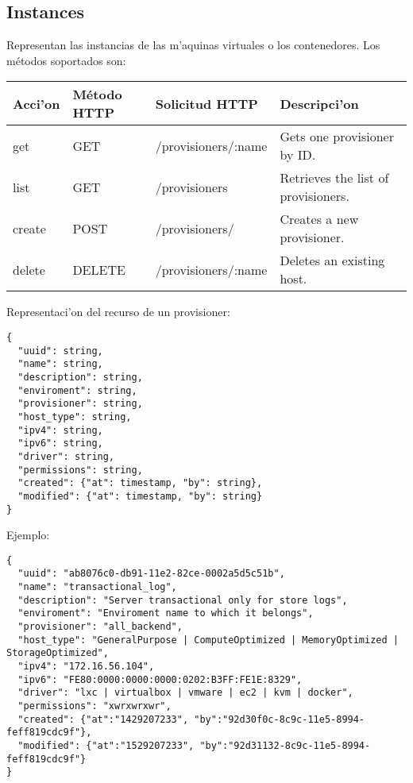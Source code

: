 \subsection{Instances}
Representan las instancias de las m'aquinas virtuales o los contenedores. Los métodos soportados son:

\begin{center}
 \begin{tabular}{| l | l | l | l |}
 \hline
  \rowcolor{blueapi}
  \textbf{Acci'on} & \textbf{Método HTTP} & \textbf{Solicitud HTTP} & \textbf{Descripci'on} \\ [0.5ex] 
  \hline\hline
  get & GET & /provisioners/:name & Gets one provisioner by ID. \\
  \hline
  list & GET & /provisioners & Retrieves the list of provisioners. \\
  \hline  
  create & POST & /provisioners/ & Creates a new provisioner. \\
  \hline
  delete & DELETE & /provisioners/:name & Deletes an existing host. \\ [1ex] 
  \hline
\end{tabular}
\end{center}

Representaci'on del recurso de un provisioner:

\medskip
\begin{lstlisting}[style=json]
{
  "uuid": string,
  "name": string,
  "description": string, 
  "enviroment": string,
  "provisioner": string,
  "host_type": string,
  "ipv4": string,
  "ipv6": string,
  "driver": string,
  "permissions": string,
  "created": {"at": timestamp, "by": string},
  "modified": {"at": timestamp, "by": string}
}
\end{lstlisting}

Ejemplo:

\medskip
\begin{lstlisting}[style=json]
{
  "uuid": "ab8076c0-db91-11e2-82ce-0002a5d5c51b",
  "name": "transactional_log",
  "description": "Server transactional only for store logs", 
  "enviroment": "Enviroment name to which it belongs",
  "provisioner": "all_backend",
  "host_type": "GeneralPurpose | ComputeOptimized | MemoryOptimized | StorageOptimized",
  "ipv4": "172.16.56.104",
  "ipv6": "FE80:0000:0000:0000:0202:B3FF:FE1E:8329",
  "driver": "lxc | virtualbox | vmware | ec2 | kvm | docker",
  "permissions": "xwrxwrxwr",
  "created": {"at":"1429207233", "by":"92d30f0c-8c9c-11e5-8994-feff819cdc9f"},
  "modified": {"at":"1529207233", "by":"92d31132-8c9c-11e5-8994-feff819cdc9f"}
}
\end{lstlisting}

